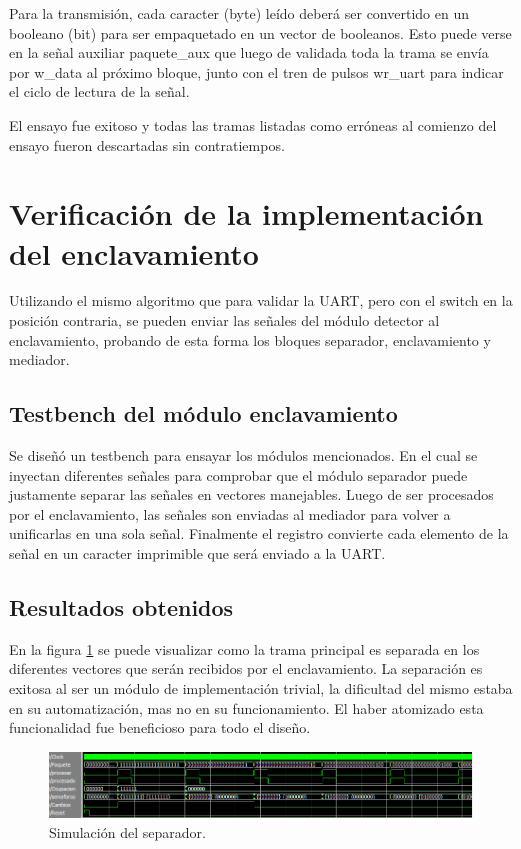 		Para la transmisión, cada caracter (byte) leído deberá ser convertido en un booleano (bit) para ser empaquetado en un vector de booleanos. Esto puede verse en la señal auxiliar paquete\_aux que luego de validada toda la trama se envía por w\_data al próximo bloque, junto con el tren de pulsos wr\_uart para indicar el ciclo de lectura de la señal.
		
		El ensayo fue exitoso y todas las tramas listadas como erróneas al comienzo del ensayo fueron descartadas sin contratiempos.
		
\section{Verificación de la implementación del enclavamiento}	

	Utilizando el mismo algoritmo que para validar la UART, pero con el switch en la posición contraria, se pueden enviar las señales del módulo detector al enclavamiento, probando de esta forma los bloques separador, enclavamiento y mediador.
	
	\subsection{Testbench del módulo enclavamiento}
			
		Se diseñó un testbench para ensayar los módulos mencionados. En el cual se inyectan diferentes señales para comprobar que el módulo separador puede justamente separar las señales en vectores manejables. Luego de ser procesados por el enclavamiento, las señales son enviadas al mediador para volver a unificarlas en una sola señal. Finalmente el registro convierte cada elemento de la señal en un caracter imprimible que será enviado a la UART.		
						
	\subsection{Resultados obtenidos}
				
		En la figura \ref{fig:Test_Separador} se puede visualizar como la trama principal es separada en los diferentes vectores que serán recibidos por el enclavamiento. La separación es exitosa al ser un módulo de implementación trivial, la dificultad del mismo estaba en su automatización, mas no en su funcionamiento. El haber atomizado esta funcionalidad fue beneficioso para todo el diseño.
		
		\begin{figure}[!hbt]
		\centering
		\includegraphics[scale=0.55]{./Figures/Test/Separador}
			\caption{Simulación del separador.}
			\label{fig:Test_Separador}
		\end{figure}
		
